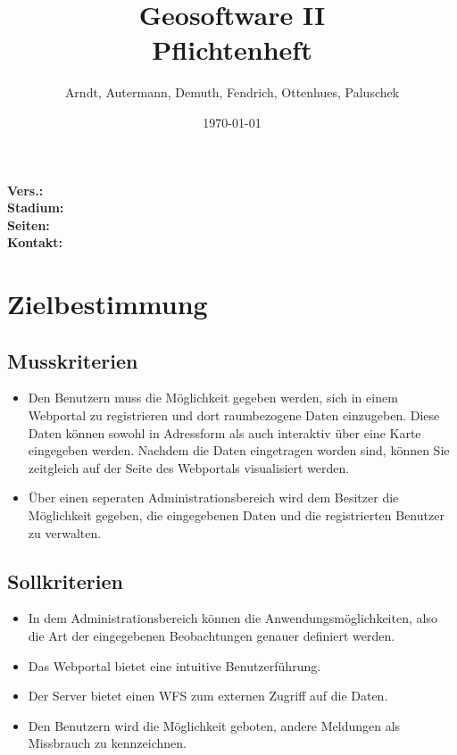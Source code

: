 \documentclass[a4paper,11pt]{scrartcl}
\begin{document}
\title{Geosoftware II \\ \small Pflichtenheft}
\author{Arndt, Autermann, Demuth, Fendrich, Ottenhues, Paluschek}
\date{\today}
\maketitle
\thispagestyle{empty}

\begin{center}
\bf Vers.: \MyVersion \\
\bf Stadium: \MyStatus\\
\bf Seiten: \thelastpage \\
\bf Kontakt: \email \\
\end{center}
\newpage

\tableofcontents

\newpage

\section{Zielbestimmung}
	\subsection{Musskriterien}
		\begin{itemize}
			\item Den Benutzern muss die Möglichkeit gegeben werden, sich in einem Webportal zu registrieren und dort raumbezogene Daten einzugeben. Diese Daten können sowohl in Adressform als auch interaktiv über eine Karte eingegeben werden. Nachdem die Daten eingetragen worden sind, können Sie zeitgleich auf der Seite des Webportals visualisiert werden.
	            \item Über einen seperaten Administrationsbereich wird dem Besitzer die Möglichkeit gegeben, die eingegebenen Daten und die registrierten Benutzer zu verwalten. 
		\end{itemize}
	\subsection{Sollkriterien}
		\begin{itemize}
			\item In dem Administrationsbereich können die Anwendungsmöglichkeiten, also die Art der eingegebenen 
                    Beobachtungen genauer definiert werden.
			\item Das Webportal bietet eine intuitive Benutzerführung.
			\item Der Server bietet einen WFS zum externen Zugriff auf die Daten.
			\item Den Benutzern wird die Möglichkeit geboten, andere Meldungen als Missbrauch zu kennzeichnen.
		\end{itemize}
\end{document}
